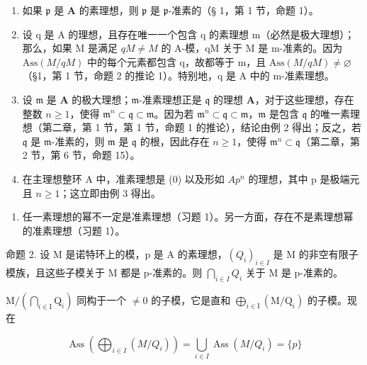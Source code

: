 \begin{enumerate}
\def\labelenumi{(\arabic{enumi})}
\item
  如果 \(\mathfrak{p}\) 是 \(\mathbf{A}\) 的素理想，则 \(\mathfrak{p}\) 是 \(\mathfrak{p}\)-准素的（§ 1，第 1 节，命题 1）。
\item
  设 q 是 A 的理想，且存在唯一一个包含 q 的素理想 m（必然是极大理想）；那么，如果 M 是满足 \(qM \neq M\) 的 A-模，qM 关于 M 是 m-准素的。因为 \(\text{Ass}(M/qM)\) 中的每个元素都包含 q，故都等于 m，且 \(\text{Ass}(M/qM) \neq \varnothing\)（§1，第 1 节，命题 2 的推论 1）。特别地，q 是 A 中的 m-准素理想。
\item
  设 \(\mathfrak{m}\) 是 \(\mathbf{A}\) 的极大理想；\(\mathfrak{m}\)-准素理想正是 \(\mathfrak{q}\) 的理想 \(\mathbf{A}\)，对于这些理想，存在整数 \(n \geqslant 1\)，使得 \(\mathfrak{m}^n \subset \mathfrak{q} \subset \mathfrak{m}\)。因为若 \(\mathfrak{m}^n \subset \mathfrak{q} \subset \mathfrak{m}\)，\(\mathfrak{m}\) 是包含 \(\mathfrak{q}\) 的唯一素理想（第二章，第 1 节，第 1 节，命题 1 的推论），结论由例 2 得出；反之，若 \(\mathfrak{q}\) 是 \(\mathfrak{m}\)-准素的，则 \(\mathfrak{m}\) 是 \(\mathfrak{q}\) 的根，因此存在 \(n \geqslant 1\)，使得 \(\mathfrak{m}^n \subset \mathfrak{q}\)（第二章，第 2 节，第 6 节，命题 15）。
\item
  在主理想整环 A 中，准素理想是 (0) 以及形如 \(Ap^{n}\) 的理想，其中 p 是极端元且 \(n \geqslant 1\)；这立即由例 3 得出。
\end{enumerate}



\begin{enumerate}
\def\labelenumi{(\arabic{enumi})}
\setcounter{enumi}{4}
\tightlist
\item
任一素理想的幂不一定是准素理想（习题 1）。另一方面，存在不是素理想幂的准素理想（习题 1）。
\end{enumerate}

命题 2. 设 M 是诺特环上的模，p 是 A 的素理想，\((Q_{i})_{i\in I}\) 是 M 的非空有限子模族，且这些子模关于 M 都是 p-准素的。则 \(\bigcap_{i\in I} Q_{i}\) 关于 M 是 p-准素的。

\(\mathrm{M}/\left(\bigcap_{i\in\mathrm{I}}\mathrm{Q}_{i}\right)\) 同构于一个 \(\neq0\) 的子模，它是直和 \(\bigoplus_{i\in\mathrm{I}}(\mathrm{M}/\mathrm{Q}_{i})\) 的子模。现在

\[
\operatorname{Ass} \left(\bigoplus_ {i \in I} (M / Q _ {i})\right) = \bigcup_ {i \in I} \operatorname{Ass} (M / Q _ {i}) = \{p \}
\]

